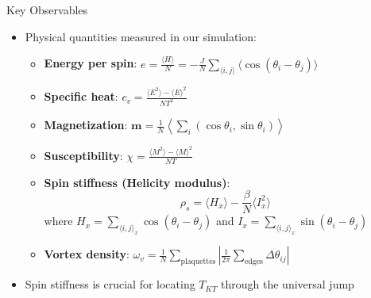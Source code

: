 \documentclass[11pt,aspectratio=169]{beamer}
\begin{document}
\begin{frame}{Key Observables}
    \begin{itemize}
        \item Physical quantities measured in our simulation:
        \begin{itemize}
            \item \textbf{Energy per spin}: $e = \frac{\langle H \rangle}{N} = -\frac{J}{N} \sum_{\langle i,j \rangle} \langle\cos(\theta_i - \theta_j)\rangle$
            \item \textbf{Specific heat}: $c_v = \frac{\langle E^2 \rangle - \langle E \rangle^2}{NT^2}$
            \item \textbf{Magnetization}: $\mathbf{m} = \frac{1}{N}\left\langle \sum_i (\cos\theta_i, \sin\theta_i) \right\rangle$
            \item \textbf{Susceptibility}: $\chi = \frac{\langle M^2 \rangle - \langle M \rangle^2}{NT}$
            \pause
            \item \textbf{Spin stiffness (Helicity modulus)}:
            \begin{equation*}
                \rho_s = \langle H_x \rangle - \frac{\beta}{N} \langle I_x^2 \rangle
            \end{equation*}
            where $H_x = \sum_{\langle i,j \rangle_x} \cos(\theta_i - \theta_j)$ and $I_x = \sum_{\langle i,j \rangle_x} \sin(\theta_i - \theta_j)$
            \pause
            \item \textbf{Vortex density}: $\omega_v = \frac{1}{N} \sum_{\text{plaquettes}} \left| \frac{1}{2\pi} \sum_{\text{edges}} \Delta\theta_{ij} \right|$
        \end{itemize}
        \item Spin stiffness is crucial for locating $T_{KT}$ through the universal jump
    \end{itemize}
\end{frame}
\end{document}
